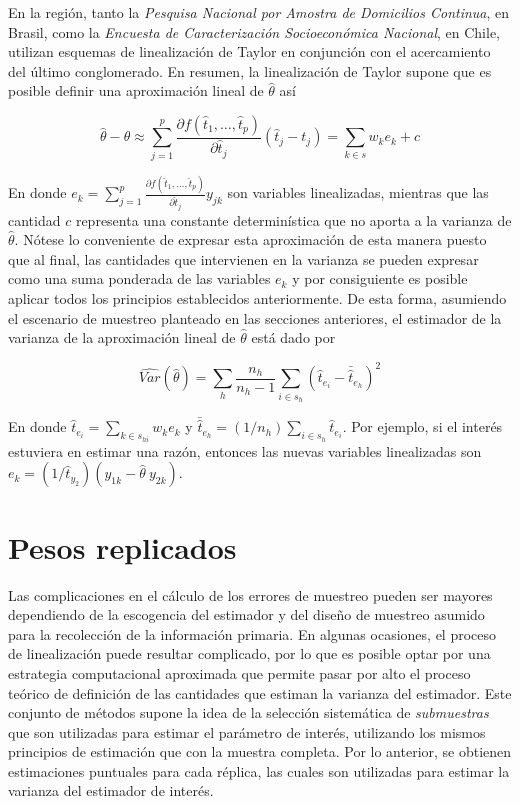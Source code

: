 \documentclass[
  12pt,
  spanish,
]{book}
\begin{document}
En la región, tanto la \emph{Pesquisa Nacional por Amostra de Domicilios Continua}, en Brasil, como la \emph{Encuesta de Caracterización Socioeconómica Nacional}, en Chile, utilizan esquemas de linealización de Taylor en conjunción con el acercamiento del último conglomerado. En resumen, la linealización de Taylor supone que es posible definir una aproximación lineal de \(\hat{\theta}\) así

\[
\hat{\theta} - \theta 
\approx \sum_{j=1}^p \frac{\partial f(\hat{t}_1, \ldots, \hat{t}_p) }{\partial \hat{t}_j}(\hat{t}_j - t_j)
= \sum_{k\in s} w_k e_k + c
\]

En donde \(e_k= \sum_{j=1}^p \frac{\partial f(\hat{t}_1, \ldots, \hat{t}_p) }{\partial \hat{t}_j} y_{jk}\) son variables linealizadas, mientras que las cantidad \(c\) representa una constante determinística que no aporta a la varianza de \(\hat{\theta}\). Nótese lo conveniente de expresar esta aproximación de esta manera puesto que al final, las cantidades que intervienen en la varianza se pueden expresar como una suma ponderada de las variables \(e_k\) y por consiguiente es posible aplicar todos los principios establecidos anteriormente. De esta forma, asumiendo el escenario de muestreo planteado en las secciones anteriores, el estimador de la varianza de la aproximación lineal de \(\hat{\theta}\) está dado por

\[
\widehat{Var}(\hat{\theta}) = 
\sum_h\frac{n_h}{n_h-1}\sum_{i\in s_h}\left(\hat{t}_{e_i}-\bar{\hat{t}}_{e_h}\right)^2
\]

En donde \(\hat{t}_{e_i} = \sum_{k \in s_{hi}} w_k e_k\) y \(\bar{\hat{t}}_{e_h}=(1/n_h)\sum_{i \in s_h}\hat{t}_{e_i}\). Por ejemplo, si el interés estuviera en estimar una razón, entonces las nuevas variables linealizadas son \(e_k=(1/\hat{t}_{y_2})(y_{1k}-\hat{\theta} \ y_{2k})\).

\hypertarget{pesos-replicados}{%
\section{Pesos replicados}\label{pesos-replicados}}

Las complicaciones en el cálculo de los errores de muestreo pueden ser mayores dependiendo de la escogencia del estimador y del diseño de muestreo asumido para la recolección de la información primaria. En algunas ocasiones, el proceso de linealización puede resultar complicado, por lo que es posible optar por una estrategia computacional aproximada que permite pasar por alto el proceso teórico de definición de las cantidades que estiman la varianza del estimador. Este conjunto de métodos supone la idea de la selección sistemática de \emph{submuestras} que son utilizadas para estimar el parámetro de interés, utilizando los mismos principios de estimación que con la muestra completa. Por lo anterior, se obtienen estimaciones puntuales para cada réplica, las cuales son utilizadas para estimar la varianza del estimador de interés.
\end{document}
